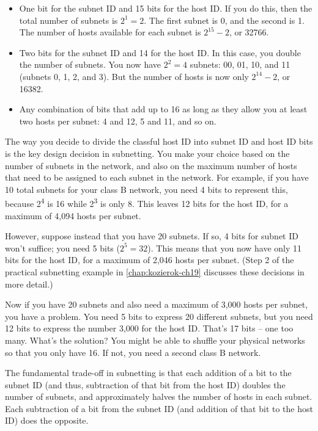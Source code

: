 \begin{itemize}
   \item
      One bit for the subnet ID and 15 bits for the host ID. If you do this,
      then the total number of subnets is $2^{1} = 2$.
      The first subnet is 0, and the second is 1.
      The number of hosts available  for each subnet is $2^{15}-2$, or 32766.
   \item
      Two bits for the subnet ID and 14 for the host ID.
      In this case, you double the number of subnets.
      You now have $2^{2}= 4$ subnets: 00, 01, 10, and 11 (subnets 0, 1, 2, and 3).
      But the number of hosts is now only $2^{14}-2$, or 16382.
   \item
      Any combination of bits that add up to 16 as long as they allow you at least two hosts per subnet: 4 and 12, 5 and 11, and so on.
\end{itemize}

The way you decide to divide the classful host ID into subnet ID and
host ID bits is the key design decision in subnetting. You make your
choice based on the number of subnets in the network, and also on the
maximum number of hosts that need to be assigned to each subnet in the
network. For example, if you have 10 total subnets for your class B
network, you need 4 bits to represent this, because 2\textsuperscript{4}
is 16 while 2\textsuperscript{3} is only 8. This leaves 12 bits for the
host ID, for a maximum of 4,094 hosts per subnet.

However, suppose instead that you have 20 subnets. If so, 4 bits for
subnet ID won't suffice; you need 5 bits ($2^{5}=32$).
This means that you now have only 11 bits for the host ID, for a maximum of 2,046 hosts per subnet.
(Step 2 of the practical subnetting example in \vref{chap:kozierok-ch19} discusses these decisions in more detail.)

Now if you have 20 subnets and also need a maximum of 3,000 hosts per
subnet, you have a problem. You need 5 bits to express 20 different
subnets, but you need 12 bits to express the number 3,000 for the host
ID. That's 17 bits -- one too many. What's the solution? You might be able to
shuffle your physical networks so that you only have 16. If not, you
need a second class B network.

\begin{keyconcept}
The fundamental trade-off in subnetting is that each addition of a bit to the subnet ID (and thus, subtraction of that bit from the host ID)
doubles the number of subnets, and approximately halves the number of hosts in each subnet.
Each subtraction of a bit from the subnet ID (and addition of that bit to the host ID) does the opposite.
\end{keyconcept}



